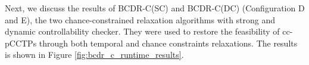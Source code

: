 \documentclass[jair,twoside,11pt,theapa]{article}
\begin{document}
%
%
%
%
 

Next, we discuss the results of BCDR-C(SC) and BCDR-C(DC) (Configuration D and
E), the two chance-constrained relaxation algorithms with strong and dynamic
controllability checker. They were used to restore the feasibility of cc-pCCTPs
through both temporal and chance constraints relaxations. The results is shown
in Figure \ref{fig:bcdr_c_runtime_results}.
\end{document}
